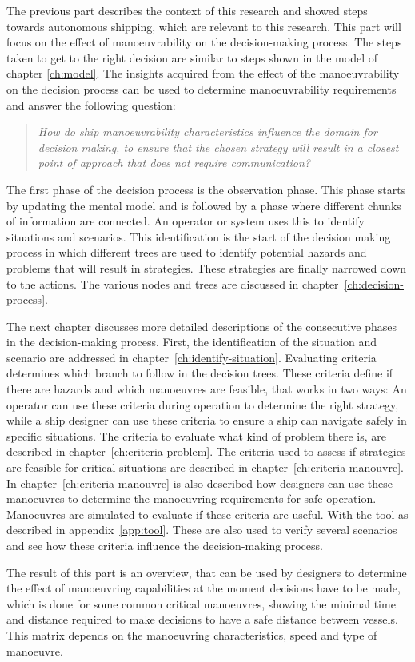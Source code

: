 
The previous part describes the context of this research and showed steps towards autonomous shipping, which are relevant to this research. This part will focus on the effect of manoeuvrability on the decision-making process. The steps taken to get to the right decision are similar to steps shown in the model of chapter \ref{ch:model}. The insights acquired from the effect of the manoeuvrability on the decision process can be used to determine manoeuvrability requirements and answer the following question:

\begin{quotation}
	\emph{How do ship manoeuvrability characteristics influence the domain for decision making, to ensure that the chosen strategy will result in a closest point of approach that does not require communication?} 
\end{quotation}

The first phase of the decision process is the observation phase. This phase starts by updating the mental model and is followed by a phase where different chunks of information are connected. An operator or system uses this to identify situations and scenarios. This identification is the start of the decision making process in which different trees are used to identify potential hazards and problems that will result in strategies. These strategies are finally narrowed down to the actions. The various nodes and trees are discussed in chapter~\ref{ch:decision-process}. 

The next chapter discusses more detailed descriptions of the consecutive phases in the decision-making process. First, the identification of the situation and scenario are addressed in chapter~\ref{ch:identify-situation}.
Evaluating criteria determines which branch to follow in the decision trees. These criteria define if there are hazards and which manoeuvres are feasible, that works in two ways: An operator can use these criteria during operation to determine the right strategy, while a ship designer can use these criteria to ensure a ship can navigate safely in specific situations. The criteria to evaluate what kind of problem there is, are described in chapter~\ref{ch:criteria-problem}. The criteria used to assess if strategies are feasible for critical situations are described in chapter~\ref{ch:criteria-manouvre}. In chapter~\ref{ch:criteria-manouvre} is also described how designers can use these manoeuvres to determine the manoeuvring requirements for safe operation. Manoeuvres are simulated to evaluate if these criteria are useful. With the tool as described in appendix~\ref{app:tool}. These are also used to verify several scenarios and see how these criteria influence the decision-making process.

The result of this part is an overview, that can be used by designers to determine the effect of manoeuvring capabilities at the moment decisions have to be made, which is done for some common critical manoeuvres, showing the minimal time and distance required to make decisions to have a safe distance between vessels. This matrix depends on the manoeuvring characteristics, speed and type of manoeuvre.